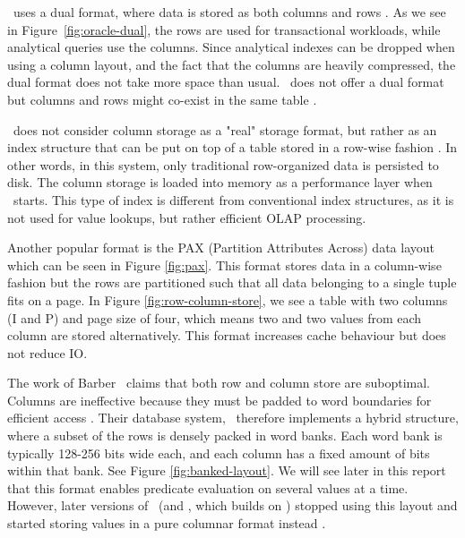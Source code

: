 \oracle~uses a dual format, where data is stored as both columns and rows \cite{Lahiri2015-mz}. As we see in Figure~\ref{fig:oracle-dual}, the rows are used for transactional workloads, while analytical queries use the columns. Since analytical indexes can be dropped when using a column layout, and the fact that the columns are heavily compressed, the dual format does not take more space than usual. \ibm~does not offer a dual format but columns and rows might co-exist in the same table \cite{Raman2013-em}.

\mssql~does not consider column storage as a "real" storage format, but rather as an index structure that can be put on top of a table stored in a row-wise fashion \cite{noauthor_undated-vq}. In other words, in this system, only traditional row-organized data is persisted to disk. The column storage is loaded into memory as a performance layer when \mssql~starts. This type of index is different from conventional index structures, as it is not used for value lookups, but rather efficient OLAP processing.


Another popular format is the PAX (Partition Attributes Across) data layout \cite{Bjorklund2011-wh, Holloway2008-rr} which can be seen in Figure \ref{fig:pax}. This format stores data in a column-wise fashion but the rows are partitioned such that all data belonging to a single tuple fits on a page. In Figure \ref{fig:row-column-store}, we see a table with two columns (I and P) and page size of four, which means two and two values from each column are stored alternatively. This format increases cache behaviour but does not reduce IO.

The work of Barber \ea~claims that both row and column store are suboptimal. Columns are ineffective because they must be padded to word boundaries for efficient access \cite{Barber2012-xt}. Their database system, \blink~therefore implements a hybrid structure, where a subset of the rows is densely packed in word banks. Each word bank is typically 128-256 bits wide each, and each column has a fixed amount of bits within that bank. See Figure \ref{fig:banked-layout}. We will see later in this report that this format enables predicate evaluation on several values at a time. However, later versions of \blink~(and \ibm, which builds on \blink) stopped using this layout and started storing values in a pure columnar format instead \cite{Raman2013-em}.


